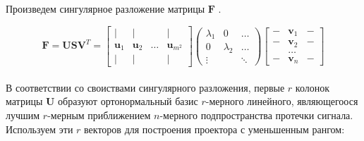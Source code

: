 Произведем сингулярное разложение матрицы $\mathbf{F}$ \cite{Golub1996}.

\begin{equation}
    \mathbf{F} = \mathbf{USV}^T 
    = 
    \begin{bmatrix}
        |            & |            &        & |       \\
        \mathbf{u}_1 & \mathbf{u}_2 & \dots  & \mathbf{u}_{m^2} \\  
        |            & |            &        & |
    \end{bmatrix}
    \begin{pmatrix}
        \lambda_1 & 0         & \dots    \\
        0         & \lambda_2 & \dots    \\
        \vdots    &           & \ddots   
    \end{pmatrix}
    \begin{bmatrix}
        - & \mathbf{v}_1 & - \\
        - & \mathbf{v}_2 & - \\
          & \dots        &   \\
        - & \mathbf{v}_n & -   
    \end{bmatrix}
\end{equation}
\\
В соответствии со своиствами сингулярного разложения, первые $r$ колонок матрицы $\mathbf{U}$
образуют ортонормальный базис $r$-мерного линейного, являющегоося лучшим $r$-мерным приближением $n$-мерного
подпространства протечки сигнала. Используем эти $r$ векторов для построения проектора с уменьшенным рангом:

